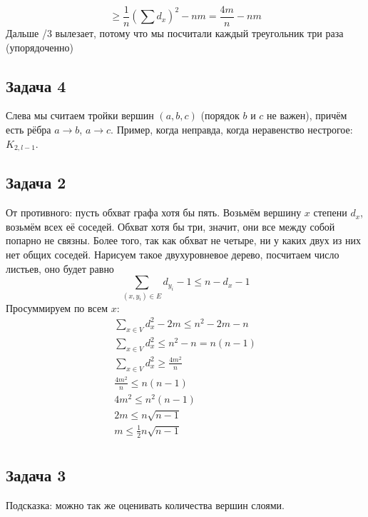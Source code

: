 	\[
		\ge \frac{1}{n} \left(\sum d_x \right)^2 - nm =
		\frac{4m}{n} - nm
	\]
	Дальше /3 вылезает, потому что мы посчитали каждый треугольник три раза (упорядоченно)

\subsection{Задача 4}
	Слева мы считаем тройки вершин $(a, b, c)$ (порядок $b$ и $c$ не важен), причём есть рёбра $a \to b$, $a \to c$.
	\TODO
	Пример, когда неправда, когда неравенство нестрогое: $K_{2,l-1}$.

\subsection{Задача 2}
	От противного: пусть обхват графа хотя бы пять.
	Возьмём вершину $x$ степени $d_x$, возьмём всех её соседей.
	Обхват хотя бы три, значит, они все между собой попарно не связны.
	Более того, так как обхват не четыре, ни у каких двух из них нет общих соседей.
	Нарисуем такое двухуровневое дерево, посчитаем число листьев, оно будет равно
	\[ \sum_{(x, y_i) \in E} d_{y_i}-1 \le n - d_x - 1 \] %
	Просуммируем по всем $x$:
	\begin{gather*}
		\sum_{x \in V} d_x^2 - 2m \le n^2 - 2m - n \\
		\sum_{x \in V} d_x^2 \le n^2 - n = n(n-1) \\
		\sum_{x \in V} d_x^2 \ge \frac{4m^2}{n} \\
		\frac{4m^2}{n} \le n(n-1) \\
		4m^2 \le n^2(n-1) \\
		2m \le n\sqrt{n-1} \\
		m \le \frac12 n\sqrt{n-1} \\
	\end{gather*}

\subsection{Задача 3}
	Подсказка: можно так же оценивать количества вершин слоями.
